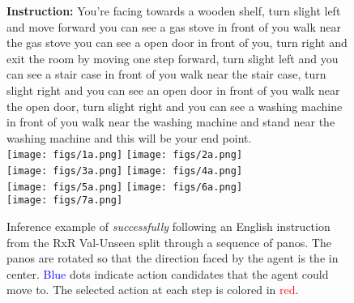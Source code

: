 \begin{figure*}[h]
  \centering
  \textbf{Instruction:} You're facing towards a wooden shelf, turn slight left and move forward you can see a gas stove in front of you walk near the gas stove you can see a open door in front of you, turn right and exit the room by moving one step forward, turn slight left and you can see a stair case in front of you walk near the stair case, turn slight right and you can see an open door in front of you walk near the open door, turn slight right and you can see a washing machine in front of you walk near the washing machine and stand near the washing machine and this will be your end point.   \vspace{1mm}\\
  \texttt{[image: figs/1a.png]}
  \texttt{[image: figs/2a.png]} \vspace{2mm}\\
  \texttt{[image: figs/3a.png]}
  \texttt{[image: figs/4a.png]} \vspace{2mm}\\
  \texttt{[image: figs/5a.png]}
  \texttt{[image: figs/6a.png]} \vspace{2mm}\\
  \texttt{[image: figs/7a.png]}
  \caption{Inference example of \ModelName{} \textit{successfully} following an English instruction from the RxR Val-Unseen split through a sequence of panos. The panos are rotated so that the direction faced by the agent is the in center. \textcolor{blue}{Blue} dots indicate action candidates that the agent could move to. The selected action at each step is colored in \textcolor{red}{red}. }
  \label{fig:example1}
\end{figure*}

